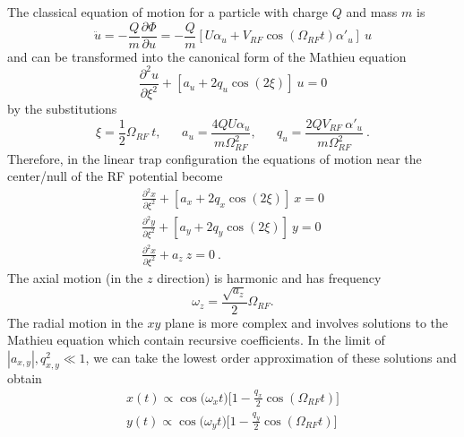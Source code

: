 The classical equation of motion for a particle with charge $Q$ and mass $m$ is
\begin{equation}
\ddot{u} = - \frac{Q}{m} \frac{\partial \Phi}{\partial u} = - \frac{Q}{m} [ U \alpha_u + V_{RF}\cos{(\Omega_{RF} t)} \alpha'_u ] \ u
\end{equation}
and can be transformed into the canonical form of the Mathieu equation 
\begin{equation}
\frac{\partial^2 u}{\partial \xi^2} + [ a_u + 2 q_u \cos{(2 \xi)} ] \ u = 0 
\end{equation}
by the substitutions
\begin{equation}
\xi = \frac{1}{2} \Omega_{RF} \ t \text{,} \ \ \ \ \ \ \ \ a_u = \frac{4 Q U \alpha_u}{m \Omega_{RF}^2} \text{,} \ \ \ \ \ \ \ \ q_u = \frac{2 Q V_{RF} \ \alpha'_u}{m \Omega_{RF}^2} \ \text{.}
\end{equation}
Therefore, in the linear trap configuration the equations of motion near the center/null of the RF potential become
\begin{equation}
\begin{split}
\frac{\partial^2 x}{\partial \xi^2} + [ a_x + 2 q_x \cos{(2 \xi)} ] \ x = 0  \\
\frac{\partial^2 y}{\partial \xi^2} + [ a_y + 2 q_y \cos{(2 \xi)} ] \ y = 0  \\
\frac{\partial^2 x}{\partial \xi^2} +  a_z  \ z = 0 \ \text{.}
\end{split}
\end{equation}
The axial motion (in the $z$ direction) is harmonic and has frequency
\begin{equation}
\omega_z = \frac{\sqrt{a_z}}{2} \Omega_{RF} \text{.}
\end{equation}
The radial motion in the $xy$ plane is more complex and involves solutions to the Mathieu equation which contain recursive coefficients. In the limit of $|a_{x,y}|, q_{x,y}^2 \ll 1$, we can take the lowest order approximation of these solutions and obtain
\begin{equation}
\begin{split}
x(t) \propto \cos\big( \omega_x t \big) \big[1 - \frac{q_x}{2} \cos (\Omega_{RF} t) \big] \\
y(t) \propto \cos\big( \omega_y t \big) \big[1 - \frac{q_y}{2} \cos (\Omega_{RF} t) \big] 
\end{split}
\end{equation}
